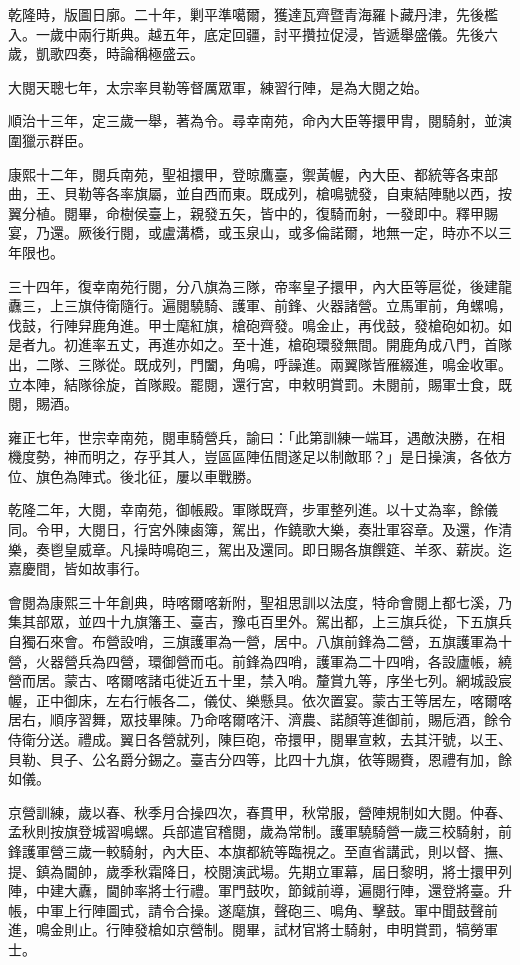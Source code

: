 \begin{pinyinscope}
乾隆時，版圖日廓。二十年，剿平準噶爾，獲達瓦齊暨青海羅卜藏丹津，先後檻入。一歲中兩行斯典。越五年，底定回疆，討平攢拉促浸，皆遞舉盛儀。先後六歲，凱歌四奏，時論稱極盛云。

大閱天聰七年，太宗率貝勒等督厲眾軍，練習行陣，是為大閱之始。

順治十三年，定三歲一舉，著為令。尋幸南苑，命內大臣等擐甲胄，閱騎射，並演圍獵示群臣。

康熙十二年，閱兵南苑，聖祖擐甲，登晾鷹臺，禦黃幄，內大臣、都統等各束部曲，王、貝勒等各率旗屬，並自西而東。既成列，槍鳴號發，自東結陣馳以西，按翼分植。閱畢，命樹侯臺上，親發五矢，皆中的，復騎而射，一發即中。釋甲賜宴，乃還。厥後行閱，或盧溝橋，或玉泉山，或多倫諾爾，地無一定，時亦不以三年限也。

三十四年，復幸南苑行閱，分八旗為三隊，帝率皇子擐甲，內大臣等扈從，後建龍纛三，上三旗侍衛隨行。遍閱驍騎、護軍、前鋒、火器諸營。立馬軍前，角螺鳴，伐鼓，行陣舁鹿角進。甲士麾紅旗，槍砲齊發。鳴金止，再伐鼓，發槍砲如初。如是者九。初進率五丈，再進亦如之。至十進，槍砲環發無間。開鹿角成八門，首隊出，二隊、三隊從。既成列，門闔，角鳴，呼譟進。兩翼隊皆雁綴進，鳴金收軍。立本陣，結隊徐旋，首隊殿。罷閱，還行宮，申敕明賞罰。未閱前，賜軍士食，既閱，賜酒。

雍正七年，世宗幸南苑，閱車騎營兵，諭曰：「此第訓練一端耳，遇敵決勝，在相機度勢，神而明之，存乎其人，豈區區陣伍間遂足以制敵耶？」是日操演，各依方位、旗色為陣式。後北征，屢以車戰勝。

乾隆二年，大閱，幸南苑，御帳殿。軍隊既齊，步軍整列進。以十丈為率，餘儀同。令甲，大閱日，行宮外陳鹵簿，駕出，作鐃歌大樂，奏壯軍容章。及還，作清樂，奏鬯皇威章。凡操時鳴砲三，駕出及還同。即日賜各旗饌筵、羊豕、薪炭。迄嘉慶間，皆如故事行。

會閱為康熙三十年創典，時喀爾喀新附，聖祖思訓以法度，特命會閱上都七溪，乃集其部眾，並四十九旗籓王、臺吉，豫屯百里外。駕出都，上三旗兵從，下五旗兵自獨石來會。布營設哨，三旗護軍為一營，居中。八旗前鋒為二營，五旗護軍為十營，火器營兵為四營，環御營而屯。前鋒為四哨，護軍為二十四哨，各設廬帳，繞營而居。蒙古、喀爾喀諸屯徙近五十里，禁入哨。釐賞九等，序坐七列。網城設宸幄，正中御床，左右行帳各二，儀仗、樂懸具。依次置宴。蒙古王等居左，喀爾喀居右，順序習舞，眾技畢陳。乃命喀爾喀汗、濟農、諾顏等進御前，賜卮酒，餘令侍衛分送。禮成。翼日各營就列，陳巨砲，帝擐甲，閱畢宣敕，去其汗號，以王、貝勒、貝子、公名爵分錫之。臺吉分四等，比四十九旗，依等賜賚，恩禮有加，餘如儀。

京營訓練，歲以春、秋季月合操四次，春貫甲，秋常服，營陣規制如大閱。仲春、孟秋則按旗登城習鳴螺。兵部遣官稽閱，歲為常制。護軍驍騎營一歲三校騎射，前鋒護軍營三歲一較騎射，內大臣、本旗都統等臨視之。至直省講武，則以督、撫、提、鎮為閫帥，歲季秋霜降日，校閱演武場。先期立軍幕，屆日黎明，將士擐甲列陣，中建大纛，閫帥率將士行禮。軍門鼓吹，節鉞前導，遍閱行陣，還登將臺。升帳，中軍上行陣圖式，請令合操。遂麾旗，聲砲三、鳴角、擊鼓。軍中聞鼓聲前進，鳴金則止。行陣發槍如京營制。閱畢，試材官將士騎射，申明賞罰，犒勞軍士。


\end{pinyinscope}
